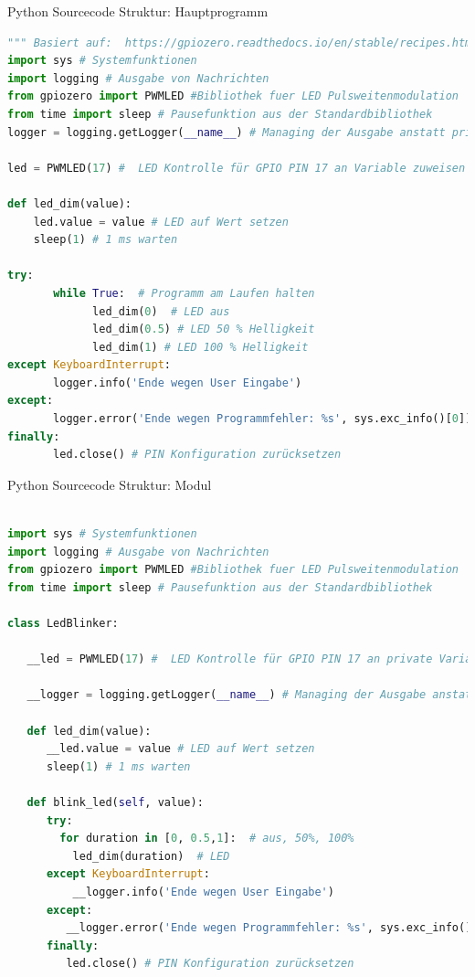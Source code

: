 \begin{frame}[fragile]{Python Sourcecode Struktur: Hauptprogramm}
\begin{lstlisting}[language=Python]
""" Basiert auf:  https://gpiozero.readthedocs.io/en/stable/recipes.html """
import sys # Systemfunktionen
import logging # Ausgabe von Nachrichten
from gpiozero import PWMLED #Bibliothek fuer LED Pulsweitenmodulation
from time import sleep # Pausefunktion aus der Standardbibliothek
logger = logging.getLogger(__name__) # Managing der Ausgabe anstatt print() Funktion

led = PWMLED(17) #  LED Kontrolle für GPIO PIN 17 an Variable zuweisen

def led_dim(value):
    led.value = value # LED auf Wert setzen
    sleep(1) # 1 ms warten

try:
       while True:  # Programm am Laufen halten
             led_dim(0)  # LED aus
             led_dim(0.5) # LED 50 % Helligkeit
             led_dim(1) # LED 100 % Helligkeit
except KeyboardInterrupt:  
       logger.info('Ende wegen User Eingabe')
except:  
       logger.error('Ende wegen Programmfehler: %s', sys.exc_info()[0])
finally:  
       led.close() # PIN Konfiguration zurücksetzen

\end{lstlisting}
\end{frame}


\begin{frame}[fragile]{Python Sourcecode Struktur: Modul}
\begin{lstlisting}[language=Python]

import sys # Systemfunktionen
import logging # Ausgabe von Nachrichten
from gpiozero import PWMLED #Bibliothek fuer LED Pulsweitenmodulation
from time import sleep # Pausefunktion aus der Standardbibliothek

class LedBlinker:
	 
   __led = PWMLED(17) #  LED Kontrolle für GPIO PIN 17 an private Variable zuweisen
   
   __logger = logging.getLogger(__name__) # Managing der Ausgabe anstatt print() Funktion
   
   def led_dim(value):
      __led.value = value # LED auf Wert setzen
      sleep(1) # 1 ms warten
   
   def blink_led(self, value):
      try:
        for duration in [0, 0.5,1]:  # aus, 50%, 100%
          led_dim(duration)  # LED     
      except KeyboardInterrupt:  
          __logger.info('Ende wegen User Eingabe')
      except:  
         __logger.error('Ende wegen Programmfehler: %s', sys.exc_info()[0]) # siehe https://docs.python.org/3/tutorial/errors.html
      finally:  
         led.close() # PIN Konfiguration zurücksetzen

\end{lstlisting}
\end{frame}


